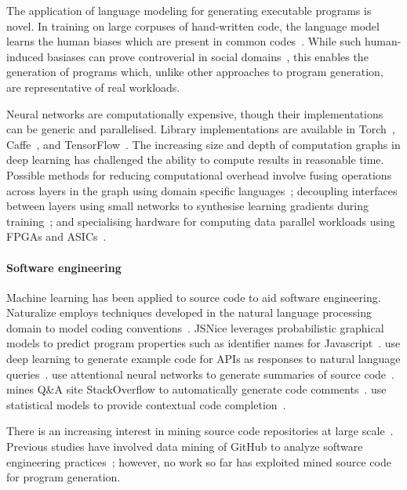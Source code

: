 The application of language modeling for generating executable programs is novel. In training on large corpuses of hand-written code, the language model learns the human biases which are present in common codes~\cite{Caliskan-islam2016}. While such human-induced basiases can prove controverial in social domains~\cite{Bolukbasi2016,Joseph2017}, this enables the generation of programs which, unlike other approaches to program generation, are representative of real workloads.

Neural networks are computationally expensive, though their implementations can be generic and parallelised. Library implementations are available in Torch~\cite{Collobert2011}, Caffe~\cite{Jia2014}, and TensorFlow~\cite{Abadi}. The increasing size and depth of computation graphs in deep learning has challenged the ability to compute results in reasonable time. Possible methods for reducing computational overhead involve fusing operations across layers in the graph using domain specific languages~\cite{Truong2016,Ashari2015a,Potter2015}; decoupling interfaces between layers using small networks to synthesise learning gradients during training~\cite{Jaderberg2016a}; and specialising hardware for computing data parallel workloads using FPGAs and ASICs~\cite{Misra2010}.


\paragraph{Software engineering} Machine learning has been applied to source code to aid software engineering. Naturalize employs techniques developed in the natural language processing domain to model coding conventions~\cite{Allamanis2014a}. JSNice leverages probabilistic graphical models to predict program properties such as identifier names for Javascript~\cite{Raychev}. \citeauthor{Zhang2015a} use deep learning to generate example code for APIs as responses to natural language queries~\cite{Zhang2015a}. \citeauthor{Allamanis2016} use attentional neural networks to generate summaries of source code~\cite{Allamanis2016}. \citeauthor{Wong2013} mines Q\&A site StackOverflow to automatically generate code comments~\cite{Wong2013}. \citeauthor{Raychev2014} use statistical models to provide contextual code completion~\cite{Raychev2014}.

There is an increasing interest in mining source code repositories at large scale~\cite{Allamanis2013a,White2015a,Bird2009}. Previous studies have involved data mining of GitHub to analyze software engineering practices~\cite{Wu2014,Guzman2014,Baishakhi2014a,Vasilescu2015}; however, no work so far has exploited mined source code for program generation.


